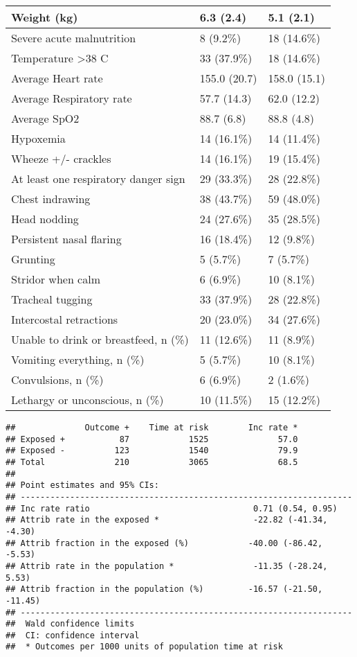\documentclass[
]{article}
\begin{document}
\begin{table}[H]
\begin{tabular}[t]{l|l|l}
\hline
Weight (kg) & 6.3 (2.4) & 5.1 (2.1)\\
\hline
Severe acute malnutrition & 8  (9.2\%) & 18 (14.6\%)\\
\hline
Temperature >38 C & 33 (37.9\%) & 18 (14.6\%)\\
\hline
Average Heart rate & 155.0 (20.7) & 158.0 (15.1)\\
\hline
Average Respiratory rate & 57.7 (14.3) & 62.0 (12.2)\\
\hline
Average SpO2 & 88.7 (6.8) & 88.8 (4.8)\\
\hline
Hypoxemia & 14 (16.1\%) & 14 (11.4\%)\\
\hline
Wheeze +/- crackles & 14 (16.1\%) & 19 (15.4\%)\\
\hline
At least one respiratory danger sign & 29 (33.3\%) & 28 (22.8\%)\\
\hline
Chest indrawing & 38 (43.7\%) & 59 (48.0\%)\\
\hline
Head nodding & 24 (27.6\%) & 35 (28.5\%)\\
\hline
Persistent nasal flaring & 16 (18.4\%) & 12  (9.8\%)\\
\hline
Grunting & 5  (5.7\%) & 7  (5.7\%)\\
\hline
Stridor when calm & 6  (6.9\%) & 10  (8.1\%)\\
\hline
Tracheal tugging & 33 (37.9\%) & 28 (22.8\%)\\
\hline
Intercostal retractions & 20 (23.0\%) & 34 (27.6\%)\\
\hline
Unable to drink or breastfeed, n (\%) & 11 (12.6\%) & 11  (8.9\%)\\
\hline
Vomiting everything, n (\%) & 5  (5.7\%) & 10  (8.1\%)\\
\hline
Convulsions, n (\%) & 6  (6.9\%) & 2  (1.6\%)\\
\hline
Lethargy or unconscious, n (\%) & 10 (11.5\%) & 15 (12.2\%)\\
\hline
\end{tabular}
\end{table}
\newpage

\begin{verbatim}
##              Outcome +    Time at risk        Inc rate *
## Exposed +           87            1525              57.0
## Exposed -          123            1540              79.9
## Total              210            3065              68.5
## 
## Point estimates and 95% CIs:
## -------------------------------------------------------------------
## Inc rate ratio                                 0.71 (0.54, 0.95)
## Attrib rate in the exposed *                   -22.82 (-41.34, -4.30)
## Attrib fraction in the exposed (%)            -40.00 (-86.42, -5.53)
## Attrib rate in the population *                -11.35 (-28.24, 5.53)
## Attrib fraction in the population (%)         -16.57 (-21.50, -11.45)
## -------------------------------------------------------------------
##  Wald confidence limits
##  CI: confidence interval
##  * Outcomes per 1000 units of population time at risk
\end{verbatim}
\end{document}
